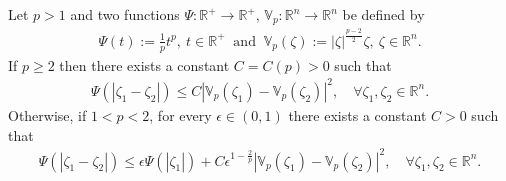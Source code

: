 \documentclass[10pt,a4paper]{amsart}
\begin{document}
\begin{lemma}\label{lem-Phi}
Let $p >1$ and two functions $\Psi: \mathbb{R}^+ \to \mathbb{R}^+$, $\mathbb{V}_{p}: \mathbb{R}^n \to \mathbb{R}^n$ be defined by
\begin{align}\label{def-Phi}
\Psi(t) := \frac{1}{p}t^p, \  t \in \mathbb{R}^+ \ \mbox{ and }  \ \mathbb{V}_{p}(\zeta) := |\zeta|^{\frac{p-2}{2}}\zeta, \ \zeta \in \mathbb{R}^n.
\end{align}
If $p \ge 2$ then there exists a constant $C = C(p)>0$ such that
\begin{align}\label{vphi-1}
\Psi(|\zeta_1-\zeta_2|) \le C |\mathbb{V}_{p}(\zeta_1) - \mathbb{V}_{p}(\zeta_2)|^2, \quad \forall \zeta_1, \zeta_2 \in \mathbb{R}^n.
\end{align}
Otherwise, if $1<p<2$, for every $\epsilon \in (0,1)$ there exists a constant $C>0$ such that
\begin{align}\label{vphi-2}
\Psi(|\zeta_1-\zeta_2|) \le \epsilon \Psi(|\zeta_1|) + C {\epsilon}^{1 -\frac{2}{p}} |\mathbb{V}_{p}(\zeta_1) - \mathbb{V}_{p}(\zeta_2)|^2, \quad \forall \zeta_1, \zeta_2 \in \mathbb{R}^n.
\end{align}
\end{lemma}
\end{document}
